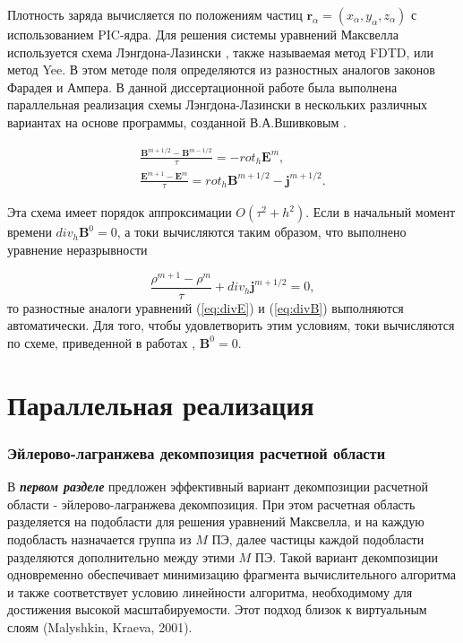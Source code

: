 Плотность заряда вычисляется по положениям частиц ${\textbf{r}}_\alpha=(x_\alpha,y_\alpha,z_\alpha)$ с использованием PIC-ядра.
Для решения системы уравнений Максвелла используется схема Лэнгдона-Лазински \cite{lasin}, также называемая метод FDTD, или метод Yee\cite{Yee}. В этом методе поля определяются из разностных аналогов законов Фарадея и Ампера. В данной диссертационной работе была выполнена параллельная реализация схемы Лэнгдона-Лазински в нескольких различных вариантах  на основе программы, созданной В.А.Вшивковым \cite{laser}.

\begin{equation}
\label{FDTD}
\begin{array}{c}
\frac{{\textbf{B}}^{m+1/2}-{\textbf{B}}^{m-1/2}}{\tau}=-rot_h {\textbf{E}}^m,
\\
\frac{{\textbf{E}}^{m+1}-{\textbf{E}}^m}{\tau}=rot_h {\textbf{B}}^{m+1/2} - {\textbf{j}}^{m+1/2}.
\end{array}
\end{equation}



Эта схема имеет порядок аппроксимации $O(\tau^2+h^2)$. Если в начальный момент времени $div_h{\textbf{B}}^0=0$, а токи вычисляются таким образом, что выполнено уравнение неразрывности 

\begin{equation}
\frac{\rho^{m+1}-\rho^m}{\tau}+div_h {\textbf{j}}^{m+1/2}=0,
\end{equation}
то разностные аналоги уравнений (\ref{eq:divE}) и (\ref{eq:divB}) выполняются автоматически.
Для того, чтобы удовлетворить этим условиям, токи вычисляются по схеме, приведенной в работах \cite{VshivkovPICbook, laser}, ${\textbf{B}}^0=0$. 

\section{ Параллельная реализация} 

\subsubsection{Эйлерово-лагранжева декомпозиция расчетной области}



В \textbf{\textit{первом разделе}}  предложен эффективный вариант декомпозиции расчетной области - эйлерово-лагранжева декомпозиция.
При этом расчетная область разделяется на подобласти для решения уравнений Максвелла, и на каждую подобласть назначается группа из $M$ ПЭ, далее частицы каждой подобласти разделяются дополнительно между этими $M$ ПЭ. Такой вариант декомпозиции одновременно обеспечивает минимизацию фрагмента вычислительного алгоритма и также соответствует условию линейности алгоритма, необходимому для достижения высокой масштабируемости. Этот подход близок к виртуальным слоям (Malyshkin, Kraeva, 2001).

